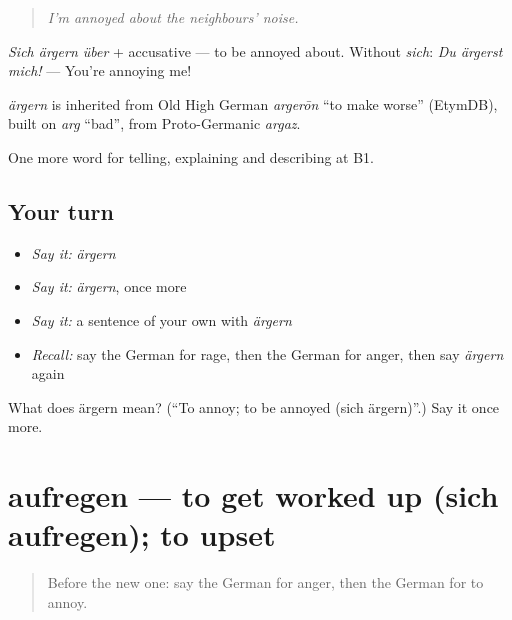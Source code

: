 \begin{quote}
\emph{I'm annoyed about the neighbours' noise.}
\end{quote}

\emph{Sich ärgern über} + accusative — to be annoyed about. Without \emph{sich}: \emph{Du ärgerst mich!} — You're annoying me!

\begin{cousinweb}
\emph{ärgern} is inherited from Old High German \emph{argerōn} \textquotedblleft{}to make worse\textquotedblright{} (EtymDB), built on \emph{arg} \textquotedblleft{}bad\textquotedblright{}, from Proto-Germanic \emph{argaz}.
\end{cousinweb}

\begin{grammarlens}[title={What you've built}]
One more word for telling, explaining and describing at B1.
\end{grammarlens}

\subsection*{Your turn}
\begin{itemize}
\raggedright
  \item \emph{Say it:} \emph{ärgern}
  \item \emph{Say it:} \emph{ärgern}, once more
  \item \emph{Say it:} a sentence of your own with \emph{ärgern}
  \item \emph{Recall:} say the German for rage, then the German for anger, then say \emph{ärgern} again
\end{itemize}

\begin{tcolorbox}[breakable,colback=teal!4,colframe=teal!35!black,title={Before you move on}]
What does ärgern mean? (\textquotedblleft{}To annoy; to be annoyed (sich ärgern)\textquotedblright{}.) Say it once more.
\end{tcolorbox}
\section[aufregen]{aufregen — to get worked up (sich aufregen); to upset}

\label{lesson:GE-C468-aufregen}



\begin{quote}
Before the new one: say the German for anger, then the German for to annoy.
\end{quote}

